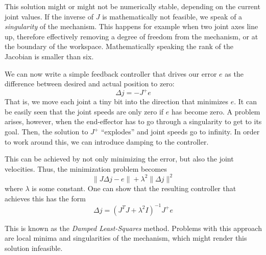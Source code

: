 This solution might or might not be numerically stable, depending on the current joint values. If the inverse of $J$ is mathematically not feasible, we speak of a \emph{singularity} of the mechanism. This happens for example when two joint axes line up, therefore effectively removing a degree of freedom from the mechanism, or at the boundary of the workspace. Mathematically speaking the rank of the Jacobian is smaller than six.

We can now write a simple feedback controller that drives our error $e$ as the difference between desired and actual position to zero:
\begin{equation}
\Delta{j}=-J^+e
\end{equation}
That is, we move each joint a tiny bit into the direction that minimizes $e$.
It can be easily seen that the joint speeds are only zero if $e$ has become zero. A problem arises, however, when the end-effector has to go through a singularity to get to its goal. Then, the solution to $ J^+$ ``explodes'' and joint speeds go to infinity. In order to work around this, we can introduce damping to the controller.

This can be achieved by not only minimizing the error, but also the joint velocities. Thus, the minimization problem becomes
\begin{equation}
\|J\Delta j-e\|+\lambda^2\|\Delta j\|^2
\end{equation}
where $\lambda$ is some constant. One can show that the resulting controller that achieves this has the form
\begin{equation}
\Delta j=(J^TJ+\lambda^2 I)^{-1}J^+e
\end{equation}

This is known as the \emph{Damped Least-Squares} method. Problems with this approach are local minima and singularities of the mechanism, which might render this solution infeasible.

